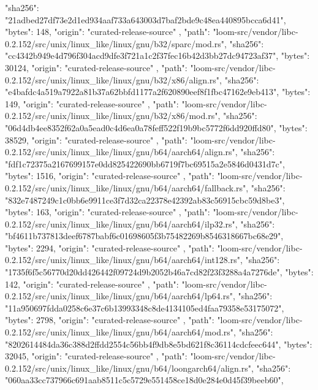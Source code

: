{{      "sha256": "21adbed27df73e2d1ed934aaf733a643003d7baf2bde9c48ea440895bcca6d41",
      "bytes": 148,
      "origin": "curated-release-source"
    },
    {
      "path": "loom-src/vendor/libc-0.2.152/src/unix/linux_like/linux/gnu/b32/sparc/mod.rs",
      "sha256": "cc4342b949e4d796f304acd9dfe3f721a1c2f37fec16b42d3bb27dc94723af37",
      "bytes": 30124,
      "origin": "curated-release-source"
    },
    {
      "path": "loom-src/vendor/libc-0.2.152/src/unix/linux_like/linux/gnu/b32/x86/align.rs",
      "sha256": "e4bafdc4a519a7922a81b37a62bbfd1177a2f620890eef8f1fbc47162e9eb413",
      "bytes": 149,
      "origin": "curated-release-source"
    },
    {
      "path": "loom-src/vendor/libc-0.2.152/src/unix/linux_like/linux/gnu/b32/x86/mod.rs",
      "sha256": "06d4db4ee8352f62a0a5ead0c4d6ea0a78feff522f19b9bc5772f6dd920ffd80",
      "bytes": 38529,
      "origin": "curated-release-source"
    },
    {
      "path": "loom-src/vendor/libc-0.2.152/src/unix/linux_like/linux/gnu/b64/aarch64/align.rs",
      "sha256": "fdf1c72375a2167699157e0dd825422690bb6719f7bc69515a2e5846d0431d7c",
      "bytes": 1516,
      "origin": "curated-release-source"
    },
    {
      "path": "loom-src/vendor/libc-0.2.152/src/unix/linux_like/linux/gnu/b64/aarch64/fallback.rs",
      "sha256": "832e7487249c1c0bb6e9911ce3f7d32ca22378e42392ab83c56915cbc59d8be3",
      "bytes": 163,
      "origin": "curated-release-source"
    },
    {
      "path": "loom-src/vendor/libc-0.2.152/src/unix/linux_like/linux/gnu/b64/aarch64/ilp32.rs",
      "sha256": "bf4611b737813deef6787babf6c01698605f3b75482269b8546318667bc68e29",
      "bytes": 2294,
      "origin": "curated-release-source"
    },
    {
      "path": "loom-src/vendor/libc-0.2.152/src/unix/linux_like/linux/gnu/b64/aarch64/int128.rs",
      "sha256": "1735f6f5c56770d20dd426442f09724d9b2052b46a7cd82f23f3288a4a7276de",
      "bytes": 142,
      "origin": "curated-release-source"
    },
    {
      "path": "loom-src/vendor/libc-0.2.152/src/unix/linux_like/linux/gnu/b64/aarch64/lp64.rs",
      "sha256": "11a950697fdda0258c6e37c6b13993348c8de4134105ed4faa79358e53175072",
      "bytes": 2798,
      "origin": "curated-release-source"
    },
    {
      "path": "loom-src/vendor/libc-0.2.152/src/unix/linux_like/linux/gnu/b64/aarch64/mod.rs",
      "sha256": "8202614484da36c388d2ffdd2554c56bb4f9db8e5bd621f8c36114cdcfeec644",
      "bytes": 32045,
      "origin": "curated-release-source"
    },
    {
      "path": "loom-src/vendor/libc-0.2.152/src/unix/linux_like/linux/gnu/b64/loongarch64/align.rs",
      "sha256": "060aa33cc737966c691aab8511c5c5729e551458ce18d0e284e0d45f39beeb60",
}}
